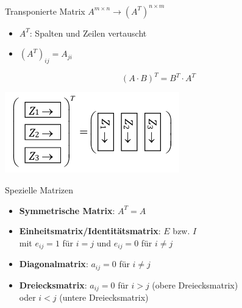     \begin{minipage}{0.65\linewidth}
        \begin{definition}{Transponierte Matrix} $A^{m \times n} \rightarrow (A^T)^{n \times m}$
            \begin{itemize}
                \item $A^T$: Spalten und Zeilen vertauscht
                \item $(A^T)_{ij} = A_{ji}$
            \end{itemize}
            \vspace{2mm}
            $${(A\cdot B)}^T = B^T\cdot A^T$$
        \end{definition}
    \end{minipage}
    \begin{minipage}{0.35\linewidth}
        \includegraphics[width=1\linewidth]{images/mat-transpos.png}
    \end{minipage}

    \begin{KR}{Spezielle Matrizen}
        \begin{itemize}
            \item \textbf{Symmetrische Matrix}: $A^T = A$
            \item \textbf{Einheitsmatrix/Identitätsmatrix}: $E$ bzw. $I$\\ mit $e_{ij} = 1$ für $i = j$ und $e_{ij} = 0$ für $i \neq j$
            \item \textbf{Diagonalmatrix}: $a_{ij} = 0$ für $i \neq j$
            \item \textbf{Dreiecksmatrix}: $a_{ij} = 0$ für $i > j$ (obere Dreiecksmatrix) \\oder $i < j$ (untere Dreiecksmatrix)
        \end{itemize}
    \end{KR}

\raggedcolumns
\columnbreak

